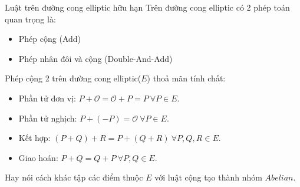 \documentclass[compress]{beamer}
\begin{document}
\begin{frame}{Luật trên đường cong elliptic hữu hạn}
Trên đường cong elliptic có 2 phép toán quan trọng là:
\begin{itemize}
\item Phép cộng (Add)
\item Phép nhân đôi và cộng (Double-And-Add)
\end{itemize}
Phép cộng 2 trên đường cong elliptic($E$) thoả mãn tính chất:
\begin{itemize}
\item Phần tử đơn vị: $P + \mathcal{O} = \mathcal{O} + P = P \ \forall P \in E$.
\item Phần tử nghịch: $P + (-P) = \mathcal{O} \ \forall P \in E$.
\item Kết hợp: $(P + Q) + R = P + (Q + R) \ \forall P,Q,R \in E$.
\item Giao hoán: $P + Q = Q + P \ \forall P,Q \in E$.
\end{itemize}
Hay nói cách khác tập các điểm thuộc $E$ với luật cộng tạo thành nhóm $Abelian$.
\end{frame}
\end{document}
